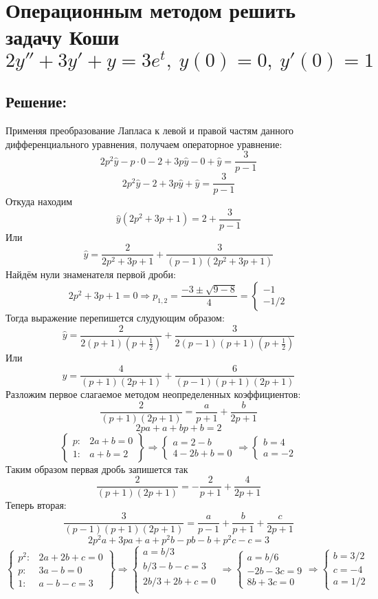 \documentclass{article}
\begin{document}
	\section{Операционным методом решить задачу Коши $2y'' + 3y' + y = 3e^t, \ y(0) = 0, \ y'(0)=1$}
	\subsection{Решение:}
	Применяя преобразование Лапласа к левой и правой частям данного дифференциального уравнения, получаем операторное уравнение:
	\[2p^2\hat{y}  - p\cdot 0 - 2 + 3p\hat{y} - 0 + \hat{y} = \frac{3}{p-1}\]
	\[2p^2\hat{y} - 2 + 3p\hat{y} + \hat{y} = \frac{3}{p-1}\]
	Откуда находим
	\[\hat{y}(2p^2 + 3p +1) = 2  +\frac{3}{p-1}\]
	Или
	\[\hat{y} = \frac{2}{2p^2 + 3p +1} + \frac{3}{(p-1)(2p^2 + 3p +1)}\]
	Найдём нули знаменателя первой дроби:
	\[2p^2 + 3p + 1 = 0 \Rightarrow p_{1,2} = \frac{-3 \pm \sqrt{9 - 8}}{4} = \begin{cases}
		-1\\
		-1/2
	\end{cases}\]
	Тогда выражение перепишется слудующим образом:
	\[\hat{y} = \frac{2}{2(p+1)(p+\frac{1}{2}) }+ \frac{3}{2(p-1)(p+1)(p+\frac{1}{2})}\]
	Или
	\[\hat{y} = \frac{4}{(p+1)(2p+1) }+ \frac{6}{(p-1)(p+1)(2p+1)}\]
	Разложим первое слагаемое методом неопределенных коэффициентов:
	\[\frac{2}{(p+1)(2p+1)} = \frac{a}{p+1} + \frac{b}{2p+1}\]
	\[2pa + a + bp + b = 2\]
	\[\begin{Bmatrix}
		p: & 2a + b = 0\\
		1: & a + b = 2
	\end{Bmatrix}\Rightarrow \begin{cases}
	a = 2 - b \\
	4 - 2b + b = 0
	\end{cases}\Rightarrow\begin{cases}
	b = 4 \\
	a = -2
	
	\end{cases}\]
	Таким образом первая дробь запишется так
	\[\frac{2}{(p+1)(2p+1)} = -\frac{2}{p+1} + \frac{4}{2p+1}\]
	Теперь вторая:
	\[\frac{3}{(p-1)(p+1)(2p+1)} = \frac{a}{p-1} + \frac{b}{p+1} + \frac{c}{2p+1}\]
	\[2p^2a + 3pa + a +p^2 b - pb - b + p^2c - c = 3\]
	\[\begin{Bmatrix}
		p^2: & 2a + 2b + c = 0\\
		p: & 3a - b = 0\\
		1: & a - b - c = 3
	\end{Bmatrix}\Rightarrow \begin{cases}
	a = b/3\\
	b/3 - b - c = 3\\
	2b/3 + 2b + c = 0\\
	
	\end{cases} \Rightarrow \begin{cases}
	a = b/6\\
	-2b - 3c = 9\\
	8b +3c= 0
	\end{cases}\Rightarrow \begin{cases}
	b = 3/2\\
	c = -4\\
	a = 1/2
	\end{cases}\]
\end{document}
